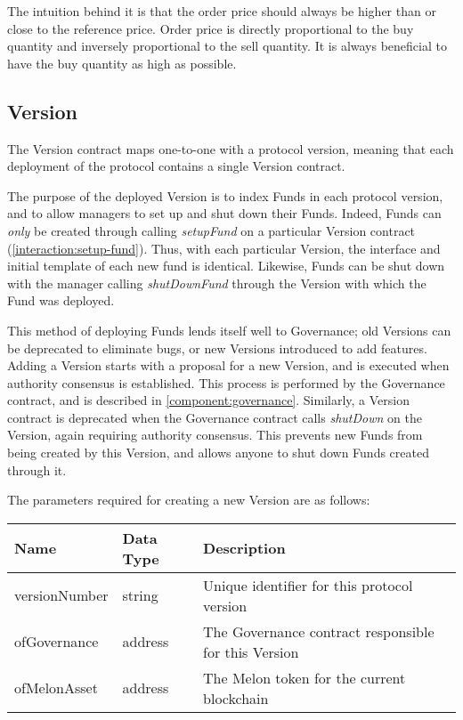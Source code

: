 \documentclass[conference]{IEEEtran}
\begin{document}
The intuition behind it is that the order price should always be higher than or close to the reference price. Order price is directly proportional to the buy quantity and inversely proportional to the sell quantity. It is always beneficial to have the buy quantity as high as possible.
\subsection{Version}

The Version contract maps one-to-one with a protocol version, meaning that each deployment of the protocol contains a single Version contract.

The purpose of the deployed Version is to index Funds in each protocol version, and to allow managers to set up and shut down their Funds.
Indeed, Funds can \textit{only} be created through calling \textit{setupFund} on a particular Version contract (\ref{interaction:setup-fund}).
Thus, with each particular Version, the interface and initial template of each new fund is identical.
Likewise, Funds can be shut down with the manager calling \textit{shutDownFund} through the Version with which the Fund was deployed.

This method of deploying Funds lends itself well to Governance; old Versions can be deprecated to eliminate bugs, or new Versions introduced to add features.
Adding a Version starts with a proposal for a new Version, and is executed when authority consensus is established.
This process is performed by the Governance contract, and is described in \ref{component:governance}.
Similarly, a Version contract is deprecated when the Governance contract calls \textit{shutDown} on the Version, again requiring authority consensus.
This prevents new Funds from being created by this Version, and allows anyone to shut down Funds created through it.

The parameters required for creating a new Version are as follows:

\begin{center}
	\footnotesize
	\begin{tabular}{ | p{2cm} | p{1.2cm} | p{4cm} | }
		\hline
		Name & Data Type & Description \\ \hline
		versionNumber & string & Unique identifier for this protocol version \\ \hline
		ofGovernance & address & The Governance contract responsible for this Version \\ \hline
		ofMelonAsset & address & The Melon token for the current blockchain  \\ \hline
	\end{tabular}
\end{center}
\end{document}
